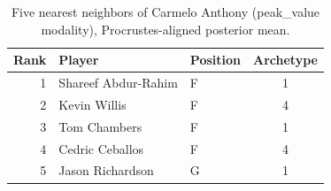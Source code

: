 \begin{table}[htbp]
  \centering\small
  \begin{tabular}{rllc}
    \toprule
    Rank & Player & Position & Archetype \\
    \midrule
    1 & Shareef Abdur-Rahim & F & 1 \\
    2 & Kevin Willis & F & 4 \\
    3 & Tom Chambers & F & 1 \\
    4 & Cedric Ceballos & F & 4 \\
    5 & Jason Richardson & G & 1 \\
    \bottomrule
  \end{tabular}
  \caption{Five nearest neighbors of Carmelo Anthony (peak_value modality), Procrustes-aligned posterior mean.}
  \label{tab:Carmelo_Anthony_neighbors_peak_value}
\end{table}

